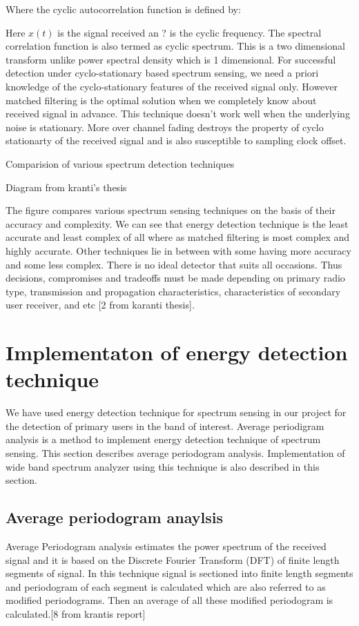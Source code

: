 Where the cyclic autocorrelation function is defined by:

Here $x(t)$ is the signal received an ? is the cyclic frequency. The spectral 
correlation function is also termed as cyclic spectrum.
This is a two dimensional transform unlike power spectral density which is 1 
dimensional. For successful detection under cyclo-stationary based spectrum 
sensing, we need a priori knowledge of the cyclo-stationary features of the 
received signal only. However matched filtering is the optimal solution when we 
completely know about received signal in advance.
This technique doesn't work well when the underlying noise is stationary. More 
over channel fading destroys the property of cyclo stationarty of the received 
signal and is also susceptible to sampling clock offset. 

Comparision of various spectrum detection techniques

Diagram from kranti's thesis 









The figure compares various spectrum sensing techniques on the basis of their 
accuracy and complexity. We can see that energy detection technique is the least
accurate and least complex of all where as matched filtering is most complex and
highly accurate. Other techniques lie in between with some having more accuracy 
and some less complex. There is no ideal detector that suits all occasions. Thus
decisions, compromises and tradeoffs must be made depending on primary radio 
type, transmission and propagation characteristics, characteristics of secondary
user receiver, and etc [2 from karanti thesis].

\section{Implementaton of energy detection technique}
We have used energy detection technique for spectrum sensing in our project for 
the detection of primary users in the band of interest. Average periodigram 
analysis is a method to implement energy detection technique of spectrum 
sensing. This section describes average periodogram analysis.  Implementation of
wide band spectrum analyzer using this technique is also described in this 
section.

\subsection{Average periodogram anaylsis}
Average Periodogram analysis estimates the power spectrum of the received signal
and it is based on the Discrete Fourier Transform (DFT) of finite length 
segments of signal. In this technique signal is sectioned into finite length 
segments and periodogram of each segment is calculated which are also referred 
to as modified periodograms. Then an average of all these modified periodogram 
is calculated.[8 from krantis report]

